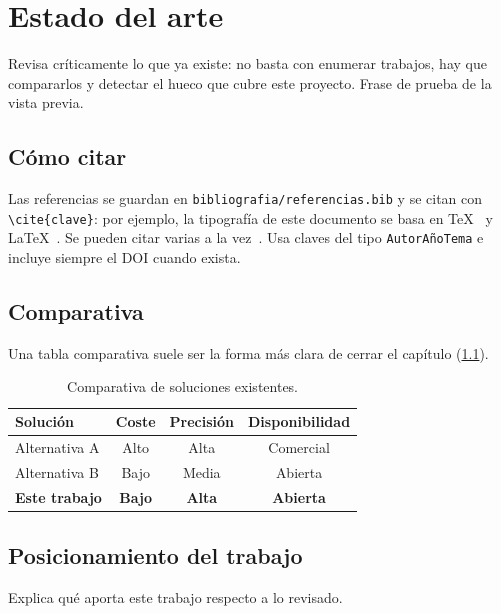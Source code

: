 \chapter{Estado del arte}\label{cap:estado-arte}

Revisa críticamente lo que ya existe: no basta con enumerar trabajos,
hay que compararlos y detectar el hueco que cubre este proyecto. Frase de prueba de la vista previa.

\section{Cómo citar}

Las referencias se guardan en \texttt{bibliografia/referencias.bib} y se
citan con \verb|\cite{clave}|: por ejemplo, la tipografía de este documento
se basa en \TeX{}~\cite{Knuth1984TeXbook} y \LaTeX{}~\cite{Lamport1994LaTeX}.
Se pueden citar varias a la vez~\cite{Knuth1984TeXbook, Lamport1994LaTeX}.
Usa claves del tipo \texttt{AutorAñoTema} e incluye siempre el DOI cuando
exista.

\section{Comparativa}

Una tabla comparativa suele ser la forma más clara de cerrar el capítulo
(\cref{tab:comparativa}).

\begin{table}[H]
  \centering
  \caption{Comparativa de soluciones existentes.}
  \label{tab:comparativa}
  \begin{tabular}{lccc}
    \toprule
    Solución & Coste & Precisión & Disponibilidad \\
    \midrule
    Alternativa A & Alto  & Alta  & Comercial \\
    Alternativa B & Bajo  & Media & Abierta   \\
    \textbf{Este trabajo} & \textbf{Bajo} & \textbf{Alta} & \textbf{Abierta} \\
    \bottomrule
  \end{tabular}
\end{table}

\section{Posicionamiento del trabajo}

Explica qué aporta este trabajo respecto a lo revisado.
